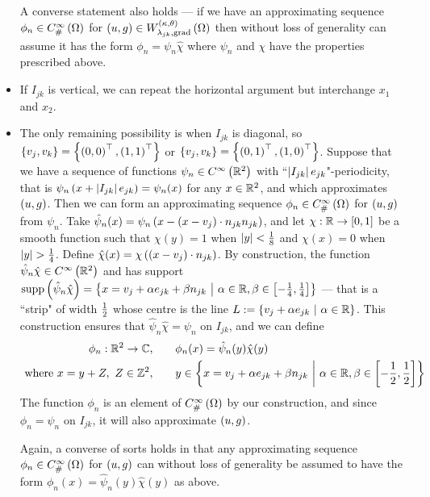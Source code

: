 \documentclass[11pt]{report}
\newcommand{\psmooth}[1]{C^{\infty}_{\#}\bracs{#1}}
\begin{document}
\begin{itemize}
	A converse statement also holds --- if we have an approximating sequence $\phi_n\in\psmooth{\ddom}$ for $\left( u,g \right)\in W^{\left( \kappa, \theta \right)}_{\lambda_{jk}, \mathrm{grad}}\left( \Omega \right)$ then without loss of generality can assume it has the form $\phi_n = \psi_n\hat{\chi}$ where $\psi_n$ and $\chi$ have the properties prescribed above.
	\item If $I_{jk}$ is vertical, we can repeat the horizontal argument but interchange $x_1$ and $x_2$.
	\item The only remaining possibility is when $I_{jk}$ is diagonal, so $\left\{ v_j,v_k \right\}=\left\{ \left( 0,0 \right)^\top, \left( 1,1 \right)^\top \right\}$ or $\left\{ v_j,v_k \right\}=\left\{ \left( 0,1 \right)^\top, \left( 1,0 \right)^\top \right\}$.
	Suppose that we have a sequence of functions $\psi_n\in C^{\infty}\left( \mathbb{R}^2 \right)$ with ``$\left\lvert I_{jk} \right\rvert e_{jk}$"-periodicity, that is $\psi_n\left( x+\left\lvert I_{jk} \right\rvert e_{jk} \right)=\psi_n(x)$ for any $x\in\mathbb{R}^2$, and which approximates $\left( u,g \right)$.
	Then we can form an approximating sequence $\phi_n\in\psmooth{\ddom}$ for $\left( u,g \right)$ from $\psi_n$.
	Take $\hat{\psi}_n(x) = \psi_n\left( x - \left( x-v_j \right)\cdot n_{jk} n_{jk} \right)$, and let $\chi:\mathbb{R}\rightarrow\left[ 0,1 \right]$ be a smooth function such that $\chi(y)=1$ when $\left\lvert y \right\rvert<\frac{1}{8}$ and $\chi(x)=0$ when $\left\lvert y \right\rvert>\frac{1}{4}$.
	Define $\hat{\chi}(x) = \chi\left( \left( x-v_j \right)\cdot n_{jk} \right)$.
	By construction, the function $\hat{\psi}_n\hat{\chi}\in C^{\infty}\left( \mathbb{R}^2 \right)$ and has support $\mathrm{supp}\left( \hat{\psi}_n\hat{\chi} \right)=\left\{ x = v_j + \alpha e_{jk} + \beta n_{jk} \ \middle\vert \  \alpha\in\mathbb{R}, \beta\in\left[ -\frac{1}{4},\frac{1}{4} \right] \right\}$ --- that is a ``strip" of width $\frac{1}{2}$ whose centre is the line $L := \left\{ v_j + \alpha e_{jk} \ \middle\vert \  \alpha\in\mathbb{R} \right\}$.
	This construction ensures that $\hat{\psi}_n\hat{\chi} = \psi_n$ on $I_{jk}$, and we can define
	\begin{align*}
		\phi_n:\mathbb{R}^2\rightarrow\mathbb{C}, &\qquad \phi_n(x) = \hat{\psi}_n(y)\hat{\chi}(y) \\
		\text{ where } x=y+Z, \ Z\in\mathbb{Z}^2, 
		&\qquad y\in\left\{ x = v_j + \alpha e_{jk} + \beta n_{jk} \ \middle\vert \  \alpha\in\mathbb{R}, \beta\in\left[ -\frac{1}{2},\frac{1}{2} \right] \right\}
	\end{align*}
	The function $\phi_n$ is an element of $\psmooth{\ddom}$ by our construction, and since $\phi_n=\psi_n$ on $I_{jk}$, it will also approximate $\left( u,g \right)$.
	
	Again, a converse of sorts holds in that any approximating sequence $\phi_n\in\psmooth{\ddom}$ for $\left( u,g \right)$ can without loss of generality be assumed to have the form $\phi_n(x) = \hat{\psi}_n(y)\hat{\chi}(y)$ as above.
\end{itemize}
\end{document}
